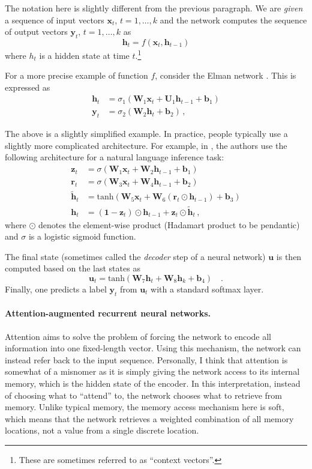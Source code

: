 \documentclass[paper=a4, fontsize=11pt,twoside, abstracton]{scrartcl}
\def\xx{{\boldsymbol x}}
\def\uu{{\boldsymbol u}}
\def\yy{{\boldsymbol y}}
\def\hh{{\boldsymbol h}}
\def\WW{{\boldsymbol W}}
\def\zz{{\boldsymbol z}}
\def\bb{{\boldsymbol b}}
\begin{document}
The notation here is slightly different from the previous paragraph. We are \emph{given} a sequence of input vectors $\xx_{t}$, $t=1, \ldots, k$ and the network computes the sequence of output vectors $\yy_{t}$, $t=1, \ldots, k$ as $$\hh_t = f(\xx_t, \hh_{t-1})$$ where $h_t$ is a hidden state at time $t$.\footnote{These are sometimes referred to as ``context vectors''.}

 For a more precise example of function $f$, consider the Elman network \citep{elman1990finding}. This is expressed as
  \begin{align}
    \hh_{t} &= \sigma_1(\WW_1 \xx_t + \boldsymbol{U}_1 \hh_{t-1} + \boldsymbol{b}_1)  \\
    \yy_t &= \sigma_2(\WW_2\hh_t + \boldsymbol{b}_2)\,,
  \end{align}

The above is a slightly simplified example. In practice, people typically use a slightly more complicated architecture. For example, in \citep{cho2014learning}, the authors use the following architecture for a natural language inference task:
  \begin{align}
    \zz_t &= \sigma(\WW_1 \xx_t + \WW_2 \hh_{t-1} + \bb_1) \\
    \boldsymbol{r}_t &= \sigma(\WW_3 \xx_t + \WW_4 \hh_{t-1} + \bb_2) \\
    \tilde{\hh}_t &= \text{tanh}(\WW_5 \xx_t + \WW_6 (\boldsymbol{r}_t  \odot \hh_{t-1}) + \bb_3) \\
    \hh_t &= (\boldsymbol{1} - \zz_t) \odot \hh_{t-1} + \zz_t \odot\tilde{\hh}_t\,,
  \end{align}
where $\odot$ denotes the element-wise product (Hadamart product to be pendantic) and $\sigma$ is a logistic sigmoid function.

The final state (sometimes called the \emph{decoder} step of a neural network) $\boldsymbol u$ is then computed based on the last states as
\begin{equation}\label{eq:rnn_prediction}
  \uu_t = \text{tanh}(\WW_7 \hh_t + \WW_8 \hh_k + \bb_4) \quad.
\end{equation}
Finally, one predicts a label $\yy_{t}$ from $\uu_t$ with a standard softmax layer.



\paragraph{Attention-augmented recurrent neural networks.} Attention aims to solve the problem of forcing the network to encode all information into one fixed-length vector. Using this mechanism, the network can instead refer back to the input sequence. Personally, I think that attention is somewhat of a misnomer as it is simply giving the network access to its internal memory, which is the hidden state of the encoder. In this interpretation, instead of choosing what to  ``attend'' to, the network chooses what to retrieve from memory. Unlike typical memory, the memory access mechanism here is soft, which means that the network retrieves a weighted combination of all memory locations, not a value from a single discrete location.
\end{document}

